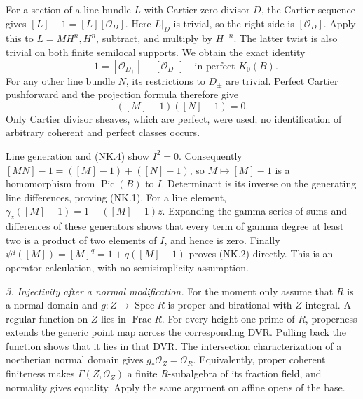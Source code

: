 For a section of a line bundle $L$ with Cartier zero divisor $D$,
the Cartier sequence gives
$[L]-1=[L][\mathcal O_D]$.  Here $L|_D$ is trivial, so the right
side is $[\mathcal O_D]$.  Apply this to $L=M H^n,H^n$, subtract,
and multiply by $H^{-n}$.  The latter twist is also trivial on
both finite semilocal supports.  We obtain the exact identity
\begin{equation}
 [M]-1=[\mathcal O_{D_+}]-[\mathcal O_{D_-}]
                       \quad\text{in perfect }K_0(B).
                                                        \tag{NK.3}
\end{equation}
For any other line bundle $N$, its restrictions to $D_\pm$ are
trivial.  Perfect Cartier pushforward and the projection formula
therefore give
\begin{equation}
                 ([M]-1)([N]-1)=0.                    \tag{NK.4}
\end{equation}
Only Cartier divisor sheaves, which are perfect, were used; no
identification of arbitrary coherent and perfect classes occurs.

Line generation and (NK.4) show $I^2=0$.  Consequently
$[MN]-1=([M]-1)+([N]-1)$, so $M\mapsto[M]-1$ is a homomorphism
from $\operatorname{Pic}(B)$ to $I$.  Determinant is its inverse
on the generating line differences, proving (NK.1).  For a line
element, $\gamma_z([M]-1)=1+([M]-1)z$.  Expanding the gamma series
of sums and differences of these generators shows that every term
of gamma degree at least two is a product of two elements of $I$,
and hence is zero.  Finally
$\psi^q([M])=[M]^q=1+q([M]-1)$ proves (NK.2) directly.  This is
an operator calculation, with no semisimplicity assumption.

\emph{3. Injectivity after a normal modification.}
For the moment only assume that $R$ is a normal domain and
$g:Z\to\operatorname{Spec}R$ is proper and birational with $Z$
integral.  A regular function on $Z$ lies in $\operatorname{Frac}R$.
For every height-one prime of $R$, properness extends the generic
point map across the corresponding DVR.  Pulling back the function
shows that it lies in that DVR.  The intersection characterization
of a noetherian normal domain gives $g_*\mathcal O_Z=\mathcal O_R$.
Equivalently, proper coherent finiteness makes $\Gamma(Z,\mathcal
O_Z)$ a finite $R$-subalgebra of its fraction field, and normality
gives equality.  Apply the same argument on affine opens of the base.

